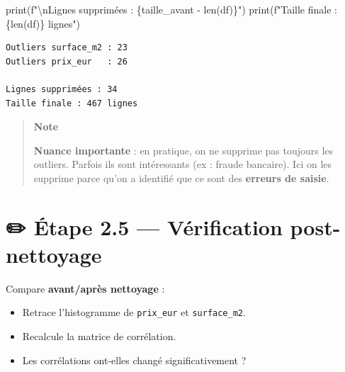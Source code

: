 \documentclass[
  french,
  11pt,
  a4paper,
]{scrbook}
\newenvironment{Shaded}{}{}
\newcommand{\BuiltInTok}[1]{\textcolor[rgb]{0.84,0.23,0.29}{#1}}
\newcommand{\CharTok}[1]{\textcolor[rgb]{0.01,0.18,0.38}{#1}}
\newcommand{\NormalTok}[1]{\textcolor[rgb]{0.14,0.16,0.18}{#1}}
\newcommand{\OperatorTok}[1]{\textcolor[rgb]{0.14,0.16,0.18}{#1}}
\newcommand{\SpecialCharTok}[1]{\textcolor[rgb]{0.00,0.36,0.77}{#1}}
\newcommand{\SpecialStringTok}[1]{\textcolor[rgb]{0.01,0.18,0.38}{#1}}
\providecommand{\tightlist}{%
  \setlength{\itemsep}{0pt}\setlength{\parskip}{0pt}}
\begin{document}
\begin{tcolorbox}
\begin{Shaded}
\begin{Highlighting}[]
\BuiltInTok{print}\NormalTok{(}\SpecialStringTok{f"}\CharTok{\textbackslash{}n}\SpecialStringTok{Lignes supprimées : }\SpecialCharTok{\{}\NormalTok{taille\_avant }\OperatorTok{{-}} \BuiltInTok{len}\NormalTok{(df)}\SpecialCharTok{\}}\SpecialStringTok{"}\NormalTok{)}
\BuiltInTok{print}\NormalTok{(}\SpecialStringTok{f"Taille finale : }\SpecialCharTok{\{}\BuiltInTok{len}\NormalTok{(df)}\SpecialCharTok{\}}\SpecialStringTok{ lignes"}\NormalTok{)}
\end{Highlighting}
\end{Shaded}

\begin{verbatim}
Outliers surface_m2 : 23
Outliers prix_eur   : 26

Lignes supprimées : 34
Taille finale : 467 lignes
\end{verbatim}

\begin{quote}
\textbf{Note}

\textbf{Nuance importante} : en pratique, on ne supprime pas toujours
les outliers. Parfois ils sont intéressants (ex : fraude bancaire). Ici
on les supprime parce qu'on a identifié que ce sont des \textbf{erreurs
de saisie}.
\end{quote}

\end{tcolorbox}

\section{✏️ Étape 2.5 --- Vérification
post-nettoyage}\label{uxe9tape-2.5-vuxe9rification-post-nettoyage}

\begin{tcolorbox}[enhanced jigsaw, arc=.35mm, bottomrule=.15mm, bottomtitle=1mm, breakable, colback=white, colbacktitle=quarto-callout-note-color!10!white, colframe=quarto-callout-note-color-frame, coltitle=black, left=2mm, leftrule=.75mm, opacityback=0, opacitybacktitle=0.6, rightrule=.15mm, title={📝 À faire}, titlerule=0mm, toprule=.15mm, toptitle=1mm]

Compare \textbf{avant/après nettoyage} :

\begin{itemize}
\tightlist
\item
  Retrace l'histogramme de \texttt{prix\_eur} et \texttt{surface\_m2}.
\item
  Recalcule la matrice de corrélation.
\item
  Les corrélations ont-elles changé significativement ?
\end{itemize}

\end{tcolorbox}
\end{document}
